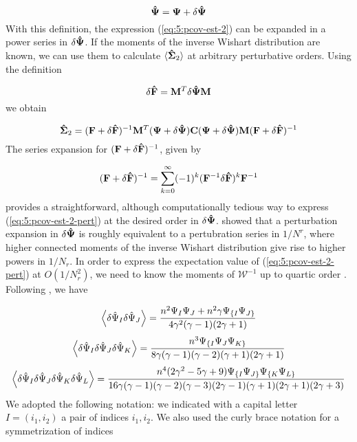 \begin{equation}
\label{eq:5:deltapsi}
\mathbf{\hat{\Psi}} = \mathbf{\Psi} + \delta\mathbf{\hat{\Psi}}
\end{equation}
%
With this definition, the expression (\ref{eq:5:pcov-est-2}) can be expanded in a power series in $\delta\mathbf{\hat{\Psi}}$. If the moments of the inverse Wishart distribution are known, we can use them to calculate $\langle\mathbf{\hat{\Sigma}}_2\rangle$ at arbitrary perturbative orders. Using the definition

\begin{equation}
\label{eq:5:deltaF}
\delta\mathbf{\hat{F}} = \mathbf{M}^T\delta\mathbf{\hat{\Psi}}\mathbf{M}
\end{equation}
%
we obtain

\begin{equation}
\label{eq:5:pcov-est-2-pert}
\mathbf{\hat{\Sigma}}_2 = (\mathbf{F}+\delta\mathbf{\hat{F}})^{-1}\mathbf{M}^T(\mathbf{\Psi}+\delta\mathbf{\hat{\Psi}})\mathbf{C}(\mathbf{\Psi}+\delta\mathbf{\hat{\Psi}})\mathbf{M}(\mathbf{F}+\delta\mathbf{\hat{F}})^{-1}
\end{equation}
%
The series expansion for $(\mathbf{F}+\delta\mathbf{\hat{F}})^{-1}$, given by

\begin{equation}
\label{eq:5:seriesdF}
(\mathbf{F}+\delta\mathbf{\hat{F}})^{-1} = \sum_{k=0}^\infty (-1)^k(\mathbf{F}^{-1}\delta\mathbf{\hat{F}})^k\mathbf{F}^{-1}
\end{equation}
%
provides a straightforward, although computationally tedious way to express (\ref{eq:5:pcov-est-2-pert}) at the desired order in $\delta\mathbf{\hat{\Psi}}$. \citep{MasumotoWishart} showed that a perturbation expansion in $\delta\mathbf{\hat{\Psi}}$ is roughly equivalent to a pertubration series in $1/N^r$, where higher connected moments of the inverse Wishart distribution give rise to higher powers in $1/N_r$. In order to express the expectation value of (\ref{eq:5:pcov-est-2-pert}) at $O(1/N_r^2)$, we need to know the moments of $\mathcal{W}^{-1}$ up to quartic order \citep{PetriVariance}. Following \citep{MasumotoWishart}, we have

\begin{equation}
\label{eq:5:inv-wishart-moments-2}
\left\langle\delta\hat{\Psi}_I\delta\hat{\Psi}_J\right\rangle = \frac{n^2\Psi_I\Psi_J + n^2\gamma\Psi_{\{ I}\Psi_{J\}}}{4\gamma^2(\gamma-1)(2\gamma+1)}
\end{equation}
%
\begin{equation}
\label{eq:5:inv-wishart-moments-3}
\left\langle\delta\hat{\Psi}_I\delta\hat{\Psi}_J\delta\hat{\Psi}_K\right\rangle = \frac{n^3\Psi_{\{ I}\Psi_J\Psi_{K\}}}{8\gamma(\gamma-1)(\gamma-2)(\gamma+1)(2\gamma+1)}
\end{equation}
%
\begin{equation}
\label{eq:5:inv-wishart-moments-4}
\left\langle\delta\hat{\Psi}_I\delta\hat{\Psi}_J\delta\hat{\Psi}_K\delta\hat{\Psi}_L\right\rangle = \frac{n^4(2\gamma^2-5\gamma+9)\Psi_{\{ I}\Psi_{J\}}\Psi_{\{ K}\Psi_{L\}}}{16\gamma(\gamma-1)(\gamma-2)(\gamma-3)(2\gamma-1)(\gamma+1)(2\gamma+1)(2\gamma+3)}
\end{equation}
%
We adopted the following notation: we indicated with a capital letter $I=(i_1,i_2)$ a pair of indices $i_1,i_2$. We also used the curly brace notation for a symmetrization of indices

